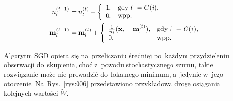 \documentclass{praca1}
\begin{document}
\begin{align}
n^{(t+1)}_l& = n^{(t)}_l + \left\{
\begin{array}{l l}     
    1, & \text{gdy } l~= C(i), \\
    0, & \text{wpp.}
\end{array}\right. \\
\mathbf{m}_l^{(t+1)}& = \mathbf{m}_l^{(t)} + \left\{
\begin{array}{l l}     
    \frac{1}{n_l}(\mathbf{x}_i - \mathbf{m}^{(t)}_l), & \text{gdy } l~= C(i), \\
    0, & \text{wpp.}
\end{array}\right.
\end{align}


Algorytm SGD opiera się na~przeliczaniu średniej po~każdym przydzieleniu obserwacji do~skupienia, choć z~powodu stochastycznego szumu, takie rozwiązanie może nie prowadzić do~lokalnego minimum, a~jedynie w~jego otoczenie. Na~Rys.~\ref{rys:006} przedstawiono przykładową drogę osiągania kolejnych wartości $\widetilde{W}$. 
\end{document}
